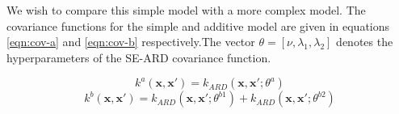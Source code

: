 \documentclass[]{article}
\begin{document}
We wish to compare this simple model with a more complex model. The covariance functions for the simple and additive model are given in equations \ref{eqn:cov-a} and \ref{eqn:cov-b} respectively.The vector $\theta = [\nu, \lambda_1, \lambda_2]$ denotes the hyperparameters of the SE-ARD covariance function.

\begin{equation}
k^a(\mathbf{x}, \mathbf{x}') = k_{ARD}(\mathbf{x}, \mathbf{x}' ; \theta^a)
\label{eqn:cov-a}
\end{equation}
\begin{equation}
k^b(\mathbf{x}, \mathbf{x}') = k_{ARD}(\mathbf{x}, \mathbf{x}' ; \theta^{b1})
+ k_{ARD}(\mathbf{x}, \mathbf{x}' ; \theta^{b2})
\label{eqn:cov-b}
\end{equation}

\begin{table}[!h]
	\centering
\end{table}
\end{document}
